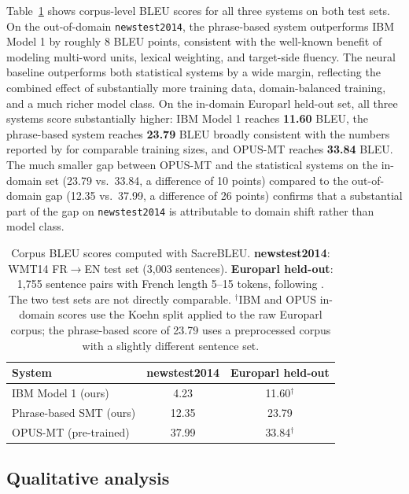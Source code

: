 \documentclass[11pt]{article}
\begin{document}
Table~\ref{tab:bleu} shows corpus-level BLEU scores for all three systems on both test sets. On the out-of-domain \texttt{newstest2014}, the phrase-based system outperforms IBM Model 1 by roughly 8 BLEU points, consistent with the well-known benefit of modeling multi-word units, lexical weighting, and target-side fluency. The neural baseline outperforms both statistical systems by a wide margin, reflecting the combined effect of substantially more training data, domain-balanced training, and a much richer model class. On the in-domain Europarl held-out set, all three systems score substantially higher: IBM Model 1 reaches \textbf{11.60} BLEU, the phrase-based system reaches \textbf{23.79} BLEU broadly consistent with the numbers reported by \citet{koehn-etal-2003-statistical} for comparable training sizes, and OPUS-MT reaches \textbf{33.84} BLEU. The much smaller gap between OPUS-MT and the statistical systems on the in-domain set (23.79 vs.\ 33.84, a difference of 10 points) compared to the out-of-domain gap (12.35 vs.\ 37.99, a difference of 26 points) confirms that a substantial part of the gap on \texttt{newstest2014} is attributable to domain shift rather than model class.

\begin{table}[t]
\centering
\small
\begin{tabular}{lcc}
\toprule
\textbf{System} & \textbf{newstest2014} & \textbf{Europarl held-out} \\
\midrule
IBM Model 1 (ours)          & 4.23  & 11.60$^\dagger$ \\
Phrase-based SMT (ours)     & 12.35 & 23.79 \\
OPUS-MT (pre-trained)       & 37.99 & 33.84$^\dagger$ \\
\bottomrule
\end{tabular}
\caption{Corpus BLEU scores computed with SacreBLEU. \textbf{newstest2014}: WMT14 FR$\rightarrow$EN test set (3{,}003 sentences). \textbf{Europarl held-out}: 1{,}755 sentence pairs with French length 5--15 tokens, following \citet{koehn-etal-2003-statistical}. The two test sets are not directly comparable. $^\dagger$IBM and OPUS in-domain scores use the Koehn split applied to the raw Europarl corpus; the phrase-based score of 23.79 uses a preprocessed corpus with a slightly different sentence set.}
\label{tab:bleu}
\end{table}
 
\subsection{Qualitative analysis}
\end{document}
